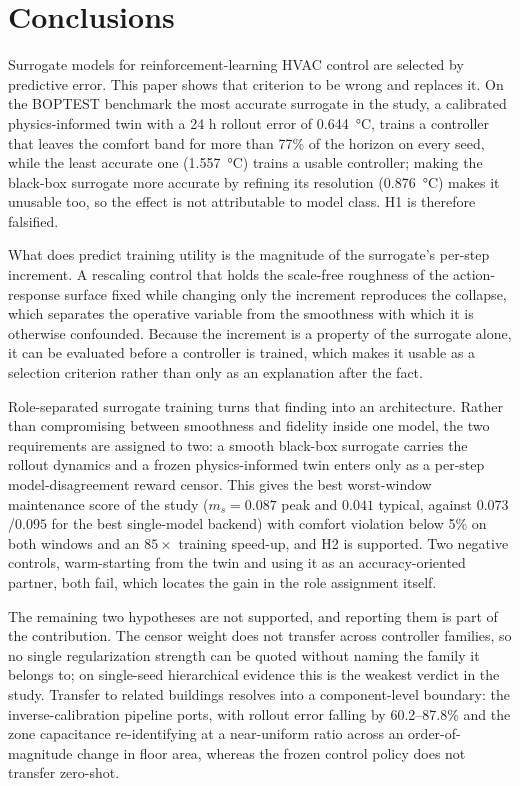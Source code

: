 \documentclass[energies,article,submit,moreauthors]{Definitions/mdpi}
\newcommand{\ms}{\ensuremath{m_s}}
\begin{document}




\section{Conclusions}\label{sec:conclusions}

Surrogate models for reinforcement-learning HVAC control are selected by predictive error. This
paper shows that criterion to be wrong and replaces it. On the BOPTEST benchmark the most accurate
surrogate in the study, a calibrated physics-informed twin with a 24 h rollout error of
\SI{0.644}{\celsius}, trains a controller that leaves the comfort band for more than 77\% of the
horizon on every seed, while the least accurate one (\SI{1.557}{\celsius}) trains a usable
controller; making the black-box surrogate more accurate by refining its resolution
(\SI{0.876}{\celsius}) makes it unusable too, so the effect is not attributable to model class. H1
is therefore falsified.

What does predict training utility is the magnitude of the surrogate's per-step increment. A
rescaling control that holds the scale-free roughness of the action-response surface fixed while
changing only the increment reproduces the collapse, which separates the operative variable from the
smoothness with which it is otherwise confounded. Because the increment is a property of the
surrogate alone, it can be evaluated before a controller is trained, which makes it usable as a
selection criterion rather than only as an explanation after the fact.

Role-separated surrogate training turns that finding into an architecture. Rather than compromising
between smoothness and fidelity inside one model, the two requirements are assigned to two: a smooth
black-box surrogate carries the rollout dynamics and a frozen physics-informed twin enters only as a
per-step model-disagreement reward censor. This gives the best worst-window maintenance score of the
study ($\ms=0.087$ peak and $0.041$ typical, against $0.073$/$0.095$ for the best single-model
backend) with comfort violation below 5\% on both windows and an $85\times$ training speed-up, and
H2 is supported. Two negative controls, warm-starting from the twin and using it as an
accuracy-oriented partner, both fail, which locates the gain in the role assignment itself.

The remaining two hypotheses are not supported, and reporting them is part of the contribution. The
censor weight does not transfer across controller families, so no single regularization strength can
be quoted without naming the family it belongs to; on single-seed hierarchical evidence this is the
weakest verdict in the study. Transfer to related buildings resolves into a component-level
boundary: the inverse-calibration pipeline ports, with rollout error falling by 60.2--87.8\% and the
zone capacitance re-identifying at a near-uniform ratio across an order-of-magnitude change in floor
area, whereas the frozen control policy does not transfer zero-shot.
\end{document}
